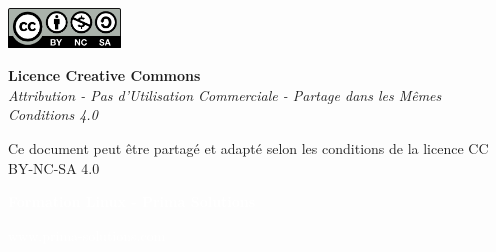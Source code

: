 \documentclass[12pt,a4paper]{article}
\begin{document}
\begin{center}
\begin{tcolorbox}[colback=white, colframe=darkgray, width=13cm, arc=3mm]
    \centering
    
    \includegraphics[width=3cm]{ressources/images/licenses/cc-by-nc-sa.png}
    
    \vspace{0.3cm}
    
    \textbf{Licence Creative Commons}\\
    \textit{Attribution - Pas d'Utilisation Commerciale - Partage dans les Mêmes Conditions 4.0}
    
    \vspace{0.2cm}
    
    {\small Ce document peut être partagé et adapté selon les conditions de la licence CC BY-NC-SA 4.0}
\end{tcolorbox}
\end{center}

\vspace{\fill}

\begin{center}
\textcolor{white}{\large\textbf{Formation Linux - Prima Solutions}}

\vspace{0.3cm}

\textcolor{white}{www.prima-solutions.com}
\end{center}
\end{document}

